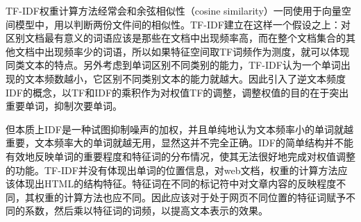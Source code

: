 \par TF-IDF权重计算方法经常会和余弦相似性（cosine similarity）一同使用于向量空间模型中，用以判断两份文件间的相似性。TF-IDF建立在这样一个假设之上：对区别文档最有意义的词语应该是那些在文档中出现频率高，而在整个文档集合的其他文档中出现频率少的词语，所以如果特征空间取TF词频作为测度，就可以体现同类文本的特点。另外考虑到单词区别不同类别的能力，TF-IDF认为一个单词出现的文本频数越小，它区别不同类别文本的能力就越大。因此引入了逆文本频度IDF的概念，以TF和IDF的乘积作为对权值TF的调整，调整权值的目的在于突出重要单词，抑制次要单词。
\par 但本质上IDF是一种试图抑制噪声的加权，并且单纯地认为文本频率小的单词就越重要，文本频率大的单词就越无用，显然这并不完全正确。IDF的简单结构并不能有效地反映单词的重要程度和特征词的分布情况，使其无法很好地完成对权值调整的功能。TF-IDF并没有体现出单词的位置信息，对web文档，权重的计算方法应该体现出HTML的结构特征。特征词在不同的标记符中对文章内容的反映程度不同，其权重的计算方法也应不同。因此应该对于处于网页不同位置的特征词赋予不同的系数，然后乘以特征词的词频，以提高文本表示的效果。